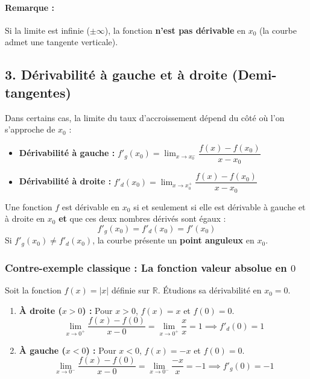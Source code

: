 \documentclass[12pt,a4paper]{article}
\begin{document}
\paragraph{Remarque :} Si la limite est infinie ($\pm \infty$), la fonction \textbf{n'est pas dérivable} en $x_0$ (la courbe admet une tangente verticale).

\subsection*{\color{myred}3. Dérivabilité à gauche et à droite (Demi-tangentes)}

Dans certains cas, la limite du taux d'accroissement dépend du côté où l'on s'approche de $x_0$ :
\begin{itemize}
    \item \textbf{Dérivabilité à gauche :} $f'_g(x_0) = \lim_{x \to x_0^-} \dfrac{f(x) - f(x_0)}{x - x_0}$
    \item \textbf{Dérivabilité à droite :} $f'_d(x_0) = \lim_{x \to x_0^+} \dfrac{f(x) - f(x_0)}{x - x_0}$
\end{itemize}

\begin{tcolorbox}[colback=gray!5!white,colframe=black,title=\textbf{Théorème : Condition de dérivabilité en $x_0$}]
Une fonction $f$ est dérivable en $x_0$ si et seulement si elle est dérivable à gauche et à droite en $x_0$ \textbf{et} que ces deux nombres dérivés sont égaux :
\[
f'_g(x_0) = f'_d(x_0) = f'(x_0)
\]
Si $f'_g(x_0) \neq f'_d(x_0)$, la courbe présente un \textbf{point anguleux} en $x_0$.
\end{tcolorbox}

\subsubsection*{\color{myred}Contre-exemple classique : La fonction valeur absolue en $0$}

Soit la fonction $f(x) = |x|$ définie sur $\mathbb{R}$. Étudions sa dérivabilité en $x_0 = 0$.

\begin{enumerate}
    \item \textbf{À droite ($x > 0$) :} Pour $x > 0$, $f(x) = x$ et $f(0) = 0$.
    \[
    \lim_{x \to 0^+} \frac{f(x) - f(0)}{x - 0} = \lim_{x \to 0^+} \frac{x}{x} = 1 \implies f'_d(0) = 1
    \]
    \item \textbf{À gauche ($x < 0$) :} Pour $x < 0$, $f(x) = -x$ et $f(0) = 0$.
    \[
    \lim_{x \to 0^-} \frac{f(x) - f(0)}{x - 0} = \lim_{x \to 0^-} \frac{-x}{x} = -1 \implies f'_g(0) = -1
    \]
\end{enumerate}
\end{document}
